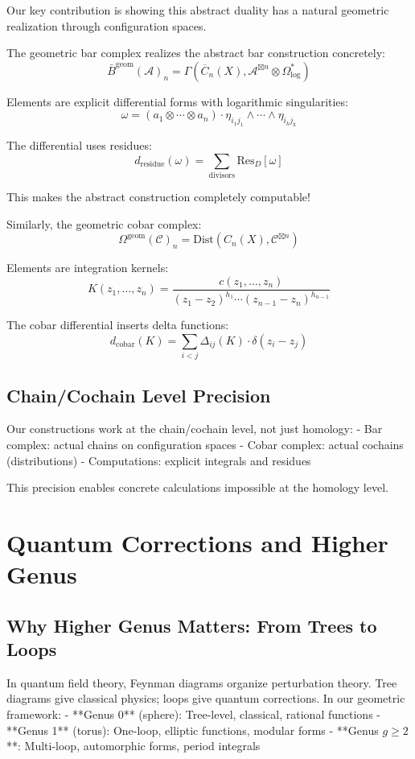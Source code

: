 Our key contribution is showing this abstract duality has a natural geometric realization through configuration spaces.

The geometric bar complex realizes the abstract bar construction concretely:
$$\bar{B}^{\text{geom}}(\mathcal{A})_n = \Gamma\left(\overline{C}_n(X), \mathcal{A}^{\boxtimes n} \otimes \Omega^*_{\text{log}}\right)$$

Elements are explicit differential forms with logarithmic singularities:
$$\omega = (a_1 \otimes \cdots \otimes a_n) \cdot \eta_{i_1j_1} \wedge \cdots \wedge \eta_{i_kj_k}$$

The differential uses residues:
$$d_{\text{residue}}(\omega) = \sum_{\text{divisors}} \text{Res}_{D}[\omega]$$

This makes the abstract construction completely computable!

Similarly, the geometric cobar complex:
$$\Omega^{\text{geom}}(\mathcal{C})_n = \text{Dist}(C_n(X), \mathcal{C}^{\boxtimes n})$$

Elements are integration kernels:
$$K(z_1, \ldots, z_n) = \frac{c(z_1, \ldots, z_n)}{(z_1-z_2)^{h_1} \cdots (z_{n-1}-z_n)^{h_{n-1}}}$$

The cobar differential inserts delta functions:
$$d_{\text{cobar}}(K) = \sum_{i<j} \Delta_{ij}(K) \cdot \delta(z_i - z_j)$$

\subsection{Chain/Cochain Level Precision}

Our constructions work at the chain/cochain level, not just homology:
- Bar complex: actual chains on configuration spaces  
- Cobar complex: actual cochains (distributions)
- Computations: explicit integrals and residues

This precision enables concrete calculations impossible at the homology level.

\section{Quantum Corrections and Higher Genus}

\subsection{Why Higher Genus Matters: From Trees to Loops}

In quantum field theory, Feynman diagrams organize perturbation theory. Tree diagrams give classical physics; loops give quantum corrections. In our geometric framework:
- **Genus 0** (sphere): Tree-level, classical, rational functions
- **Genus 1** (torus): One-loop, elliptic functions, modular forms
- **Genus $g \geq 2$**: Multi-loop, automorphic forms, period integrals

